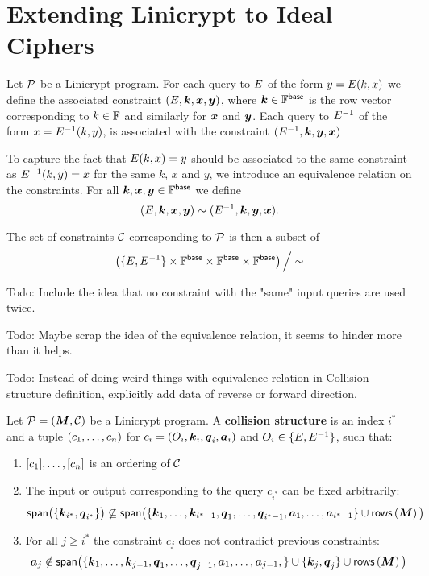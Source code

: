 \chapter{Extending Linicrypt to Ideal Ciphers}

Let $\P$ be a Linicrypt program.
For each query to $\E$ of the form $y = \E(k,x)$ we define the associated constraint
$(\E, \v k, \v x, \v y)$, where $\v k \in \F^\base$ is the row vector corresponding
to $k \in \F$ and similarly for $\v x$ and $\v y$.
Each query to $\D$ of the form $x = \D(k, y)$, is associated with the
constraint $(\D, \v k, \v y, \v x)$

To capture the fact that $\E(k, x) = y$ should be associated to the same
constraint as $\D(k,y) = x$ for the same $k$, $x$ and $y$,
we introduce an equivalence relation on the constraints. 
For all $\v k, \v x, \v y \in \Base$ we define
\[
    (\E, \v k,\v x, \v y) \sim (\D, \v k, \v y, \v x).
\]

The set of constraints $\C$ corresponding to $\P$ is then a subset of
\[
    \left( \{\E, \D\} \times \Base \times \Base \times \Base \right) \Big/\sim
\]


Todo: Include the idea that no constraint with the "same" input queries 
are used twice.

Todo: Maybe scrap the idea of the equivalence relation, it seems to hinder more
than it helps.

Todo: Instead of doing weird things with equivalence relation in Collision structure
definition, explicitly add data of reverse or forward direction.


\begin{defn}
    Let $\P = (\M, \C)$ be a Linicrypt program.
    A \textbf{collision structure} is an index $i^*$ and a tuple
    $(\c_1, \dots, \c_n)$ for $c_i = (O_i, \v k_i, \v q_i, \v a_i)$ and
    $O_i \in \{\E, \D\}$, such that:
    \begin{enumerate}
        \item $[\c_1], \dots, [\c_n]$ is an ordering of $\C$
        \item The input or output corresponding to the query $c_{i^*}$ can be fixed arbitrarily:
        \[
            \span\big(\{ \v k_{i^*}, \v q_{i^*} \}\big) \nsubseteq
            \span\big( 
            \{
            \v k_1, \dots, \v k_{i^* -1},
            \v q_1, \dots, \v q_{i^* -1},
            \v a_1, \dots, \v a_{i^* -1}
            \}
            \cup \rows\left(\M\right)
            \big)
        \]
        \item For all $j \geq i^*$ the constraint $c_j$ does not contradict previous constraints: 
        \[
            \v a_j \notin \span\big( \{
            \v k_1, \dots, \v k_{j -1},
            \v q_1, \dots, \v q_{j -1},
            \v a_1, \dots, \v a_{j -1},
            \} 
            \cup \{ \v k_j, \v q_j\}
            \cup \rows\left(\M\right)
            \big)
        \]
    \end{enumerate}
\end{defn}
